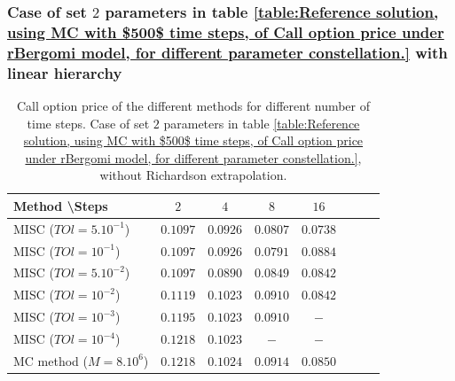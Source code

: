 \documentclass[11pt]{article}
\begin{document}
\subsubsection{Case of set $2$ parameters in table \ref{table:Reference solution, using MC with $500$ time steps, of Call option price under rBergomi model, for different parameter constellation.} with linear hierarchy}
\label{sec:Case of set $2$ parameters_linear}


\begin{table}[h!]
	\centering
	\begin{tabular}{l*{6}{c}r}
		Method \textbackslash  Steps            & $2$ & $4$ & $8$ & $16$  \\
		\hline
		MISC ($TOl=5.10^{-1}$)  & $0.1097$ & $0.0926$ & $0.0807$ & $0.0738$  \\
		MISC ($TOl=10^{-1}$)  &$0.1097$ & $0.0926$ & $0.0791$ & $0.0884$  \\
		MISC ($TOl=5.10^{-2}$)  & $0.1097$ & $0.0890$ & $0.0849$ & $0.0842$  \\
		MISC ($TOl=10^{-2}$)  & $0.1119$&  $0.1023$ & $0.0910$ & $0.0842$ \\
		MISC ($TOl=10^{-3}$)        & $0.1195$ &$0.1023$ &   $0.0910$ &  $-$ \\
		MISC ($TOl=10^{-4}$)        & $0.1218$ &$0.1023$ &  $-$ &  $-$ \\
		\hline
		MC method ($M=8.10^{6}$)   & $0.1218 $  & $0.1024 $  & $0.0914$ & $0.0850 $ \\		
		\hline
	\end{tabular}
	\caption{ Call option price of the different methods for different number of time steps. Case of set $2$ parameters in table \ref{table:Reference solution, using MC with $500$ time steps, of Call option price under rBergomi model, for different parameter constellation.}, without Richardson extrapolation.}
	\label{table: Call option price of the different methods for different number of time steps. Case set 2_linear}
\end{table}
\end{document}
